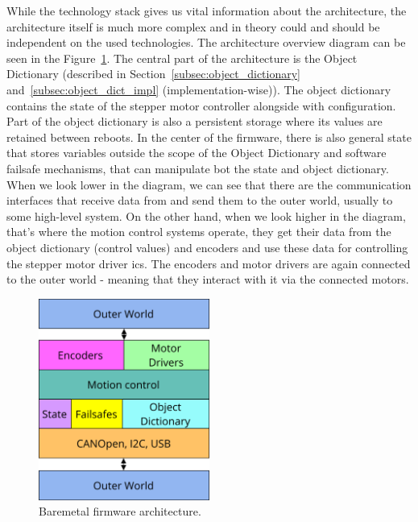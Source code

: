 While the technology stack gives us vital information about the architecture, the architecture itself is much more complex and in theory could and should be independent on the used technologies\cite{thomas_pragmatic_2019}.
The architecture overview diagram can be seen in the Figure~\ref{fig:firmware_arch}.
The central part of the architecture is the Object Dictionary (described in Section~\ref{subsec:object_dictionary} and~\ref{subsec:object_dict_impl} (implementation-wise)).
The object dictionary contains the state of the stepper motor controller alongside with configuration.
Part of the object dictionary is also a persistent storage where its values are retained between reboots.
In the center of the firmware, there is also general state that stores variables outside the scope of the Object Dictionary and software failsafe mechanisms, that can manipulate bot the state and object dictionary.
When we look lower in the diagram, we can see that there are the communication interfaces that receive data from and send them to the outer world, usually to some high-level system.
On the other hand, when we look higher in the diagram, that's where the motion control systems operate, they get their data from the object dictionary (control values) and encoders and use these data for controlling the stepper motor driver \acs{ic}s.
The encoders and motor drivers are again connected to the outer world - meaning that they interact with it via the connected motors.

\begin{figure}[H]
    \centering
    \includegraphics[width=0.5\textwidth]{obrazky/firmware_arch}
    \caption{Bare\textendash metal firmware architecture.}
    \label{fig:firmware_arch}
\end{figure}

